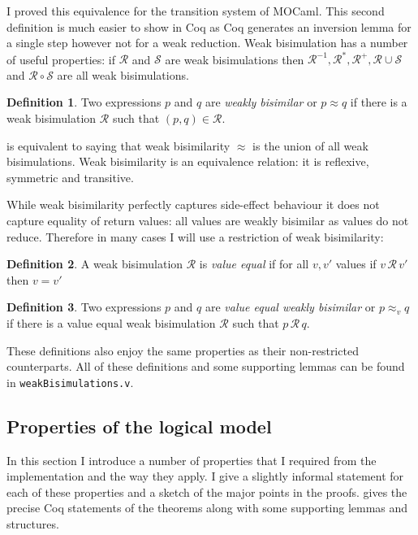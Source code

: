 \documentclass[12pt,twoside,notitlepage]{report}
\theoremstyle{plain}%
\theoremstyle{definition}
\newtheorem{defn}{Definition}[section]
\theoremstyle{remark}
\begin{document}
I proved this equivalence for the transition system of MOCaml. This second definition is much easier to show in Coq as Coq generates an inversion lemma for a single step however not for a weak reduction. Weak bisimulation has a number of useful properties: if $ \mathcal{R} $ and $ \mathcal{S} $ are weak bisimulations then $ \mathcal{R}^{-1}, \mathcal{R}^*, \mathcal{R}^+, \mathcal{R}\cup\mathcal{S}$  and $\mathcal{R} \circ \mathcal{S} $ are all weak bisimulations.
\begin{defn}
\label{defn:weak_bisimilarity}
Two expressions $ p $ and $ q $ are \textit{weakly bisimilar} or $ p\approx q $ if there is a weak bisimulation $ \mathcal{R} $ such that $ (p,q) \in \mathcal{R} $.
\end{defn}

 is equivalent to saying that weak bisimilarity $ \approx  $ is the union of all weak bisimulations. Weak bisimilarity is an equivalence relation: it is reflexive, symmetric and transitive.

While weak bisimilarity perfectly captures side-effect behaviour it does not capture equality of return values: all values are weakly bisimilar as values do not reduce. Therefore in many cases I will use a restriction of weak bisimilarity:

\begin{defn}
\label{defn:ve_weak_bisim}
A weak bisimulation $ \mathcal{R} $ is \textit{value equal} if for all $ v, v' $ values if $ v\,\mathcal{R}\,v' $ then $ v = v' $
\end{defn}

\begin{defn}
\label{defn:ve_weak_bisimilarity}
Two expressions $ p $ and $ q $ are \textit{value equal weakly bisimilar} or $ p\approx_v q $ if there is a value equal weak bisimulation $ \mathcal{R} $ such that $ p\, \mathcal{R} \, q $.
\end{defn}

These definitions also enjoy the same properties as their non-restricted counterparts. All of these definitions and some supporting lemmas can be found in \verb|weakBisimulations.v|.
\subsection{Properties of the logical model}

In this section I introduce a number of properties that I required from the implementation and the way they apply. I give a slightly informal statement for each of these properties and a sketch of the major points in the proofs.  gives the precise Coq statements of the theorems along with some supporting lemmas and structures. 
\end{document}
